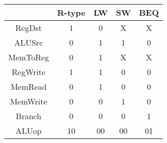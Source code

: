 \begin{tabular}[t]{ccccc}
    \toprule
             & R-type      & LW          & SW          & BEQ         \\
    \midrule
    RegDst   & {1}  & {0}  & {X}  & {X}  \\
    ALUSrc   & {0}  & {1}  & {1}  & {0}  \\
    MemToReg & {0}  & {1}  & {X}  & {X}  \\
    RegWrite & {1}  & {1}  & {0}  & {0}  \\
    MemRead  & {0}  & {1}  & {0}  & {0}  \\
    MemWrite & {0}  & {0}  & {1}  & {0}  \\
    Branch   & {0}  & {0}  & {0}  & {1}  \\
    ALUop    & {10} & {00} & {00} & {01} \\
    \bottomrule
\end{tabular}
